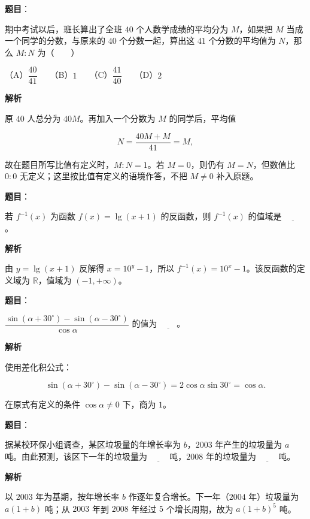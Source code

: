 \begin{answer}

\textbf{题目}：

期中考试以后，班长算出了全班 $40$ 个人数学成绩的平均分为 $M$，如果把 $M$ 当成一个同学的分数，与原来的 $40$ 个分数一起，算出这 $41$ 个分数的平均值为 $N$，那么 $M:N$ 为\mbox{（　　）}

（A）$\dfrac{40}{41}$　　（B）$1$　　（C）$\dfrac{41}{40}$　　（D）$2$

\textbf{解析}

原 $40$ 人总分为 $40M$。再加入一个分数为 $M$ 的同学后，平均值

\nopagebreak[4]
\[N=\frac{40M+M}{41}=M,\]

故在题目所写比值有定义时，$M:N=1$。若 $M=0$，则仍有 $M=N$，但数值比 $0:0$ 无定义；这里按比值有定义的语境作答，不把 $M\ne0$ 补入原题。


\end{answer}
\begin{answer}

\textbf{题目}：

若 $f^{-1}(x)$ 为函数 $f(x)=\lg(x+1)$ 的反函数，则 $f^{-1}(x)$ 的值域是 $\underline{\qquad}$。

\textbf{解析}

由 $y=\lg(x+1)$ 反解得 $x=10^y-1$，所以 $f^{-1}(x)=10^x-1$。该反函数的定义域为 $\mathbb R$，值域为 $(-1,+\infty)$。


\end{answer}
\begin{answer}

\textbf{题目}：

$\dfrac{\sin(\alpha+30^\circ)-\sin(\alpha-30^\circ)}{\cos\alpha}$ 的值为 $\underline{\qquad}$。

\textbf{解析}

使用差化积公式：

\nopagebreak[4]
\[
\sin(\alpha+30^\circ)-\sin(\alpha-30^\circ)
=2\cos\alpha\sin30^\circ=\cos\alpha.
\]

在原式有定义的条件 $\cos\alpha\ne0$ 下，商为 $1$。


\end{answer}
\begin{answer}

\textbf{题目}：

据某校环保小组调查，某区垃圾量的年增长率为 $b$，$2003$ 年产生的垃圾量为 $a$ 吨。由此预测，该区下一年的垃圾量为 $\underline{\qquad}$ 吨，$2008$ 年的垃圾量为 $\underline{\qquad}$ 吨。

\textbf{解析}

以 $2003$ 年为基期，按年增长率 $b$ 作逐年复合增长。下一年（$2004$ 年）垃圾量为 $a(1+b)$ 吨；从 $2003$ 年到 $2008$ 年经过 $5$ 个增长周期，故为 $a(1+b)^5$ 吨。


\end{answer}
